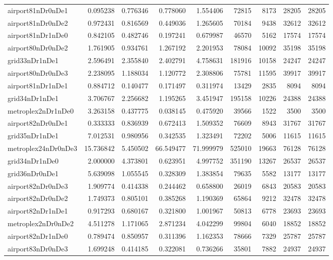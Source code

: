 \begin{longtable}{|l|r|r|r|r|r|r|r|r|}
airport81nDr0nDe1 & 0.095238 & 0.776346 & 0.778060 & 1.554406 & 72815 & 8173 & 28205 & 28205 \\
airport81nDr0nDe2 & 0.972431 & 0.816569 & 0.449036 & 1.265605 & 70184 & 9438 & 32612 & 32612 \\
airport81nDr1nDe0 & 0.842105 & 0.482746 & 0.197241 & 0.679987 & 46570 & 5162 & 17574 & 17574 \\
airport80nDr0nDe2 & 1.761905 & 0.934761 & 1.267192 & 2.201953 & 78084 & 10092 & 35198 & 35198 \\
grid33nDr1nDe1 & 2.596491 & 2.355840 & 2.402791 & 4.758631 & 181916 & 10158 & 24247 & 24247 \\
airport80nDr0nDe3 & 2.238095 & 1.188034 & 1.120772 & 2.308806 & 75781 & 11595 & 39917 & 39917 \\
airport81nDr1nDe1 & 0.884712 & 0.140477 & 0.171497 & 0.311974 & 13429 & 2835 & 8094 & 8094 \\
grid34nDr1nDe1 & 3.706767 & 2.256682 & 1.195265 & 3.451947 & 195158 & 10226 & 24388 & 24388 \\
metroplex2nDr1nDe0 & 3.263158 & 0.437775 & 0.038145 & 0.475920 & 39566 & 1522 & 3500 & 3500 \\
airport82nDr0nDe1 & 0.333333 & 0.836939 & 0.672413 & 1.509352 & 76609 & 8943 & 31767 & 31767 \\
grid35nDr1nDe1 & 7.012531 & 0.980956 & 0.342535 & 1.323491 & 72202 & 5006 & 11615 & 11615 \\
metroplex24nDr0nDe3 & 15.736842 & 5.450502 & 66.549477 & 71.999979 & 525010 & 19663 & 76128 & 76128 \\
grid34nDr1nDe0 & 2.000000 & 4.373801 & 0.623951 & 4.997752 & 351190 & 13267 & 26537 & 26537 \\
grid36nDr0nDe1 & 5.639098 & 1.055545 & 0.328309 & 1.383854 & 79635 & 5582 & 13177 & 13177 \\
airport82nDr0nDe3 & 1.909774 & 0.414338 & 0.244462 & 0.658800 & 26019 & 6843 & 20583 & 20583 \\
airport82nDr0nDe2 & 1.749373 & 0.805101 & 0.385268 & 1.190369 & 65864 & 9212 & 32478 & 32478 \\
airport82nDr1nDe1 & 0.917293 & 0.680167 & 0.321800 & 1.001967 & 50813 & 6778 & 23693 & 23693 \\
metroplex2nDr0nDe2 & 4.511278 & 1.171065 & 2.871234 & 4.042299 & 99804 & 6040 & 18852 & 18852 \\
airport82nDr1nDe0 & 0.789474 & 0.850957 & 0.311396 & 1.162353 & 78666 & 7329 & 25787 & 25787 \\
airport83nDr0nDe3 & 1.699248 & 0.414185 & 0.322081 & 0.736266 & 35801 & 7882 & 24937 & 24937 \\

\end{longtable}
